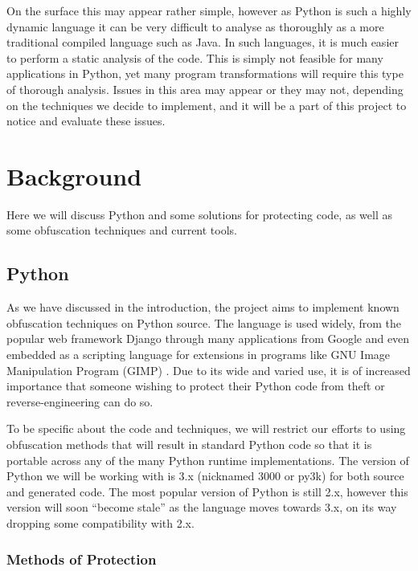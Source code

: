 \documentclass[twoside,a4paper]{report}
\begin{document}
On the surface this may appear rather simple, however as Python is such a highly dynamic language it can be very difficult to analyse
\cite[p13]{staticanal} as thoroughly as a more traditional compiled language such as Java. In such languages, it is much easier to perform a static
analysis of the code. This is simply not feasible for many applications in Python, yet many program transformations will require this type of
thorough analysis. Issues in this area may appear or they may not, depending on the techniques we decide to implement, and it will be a part of
this project to notice and evaluate these issues.

\section{Background}

Here we will discuss Python and some solutions for protecting code, as well as some obfuscation techniques
and current tools.

\subsection{Python}

As we have discussed in the introduction, the project aims to implement known obfuscation techniques on Python source.
The language is used widely, from the popular web framework Django \cite{django} through many applications
from Google \cite{pygoogle} and even embedded as a scripting language for extensions in programs like GNU
Image Manipulation Program (GIMP) \cite{gimp}. Due to its wide and varied use, it is of increased importance
that someone wishing to protect their Python code from theft or reverse-engineering can do so.

To be specific about the code and techniques, we will restrict our efforts to using obfuscation methods that will
result in standard Python code so that it is portable across any of the many Python runtime implementations. The version
of Python we will be working with is 3.x (nicknamed 3000 or py3k) for both source and generated code. The most popular
version of Python is still 2.x, however this version will soon ``become stale'' as the language moves towards 3.x, on its way
dropping some compatibility with 2.x.

\subsubsection{Methods of Protection}
\end{document}
